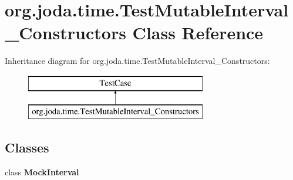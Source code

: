 \hypertarget{classorg_1_1joda_1_1time_1_1_test_mutable_interval___constructors}{\section{org.\-joda.\-time.\-Test\-Mutable\-Interval\-\_\-\-Constructors Class Reference}
\label{classorg_1_1joda_1_1time_1_1_test_mutable_interval___constructors}
}
Inheritance diagram for org.\-joda.\-time.\-Test\-Mutable\-Interval\-\_\-\-Constructors\-:\begin{figure}[H]
\begin{center}
\leavevmode
\includegraphics[height=2.000000cm]{classorg_1_1joda_1_1time_1_1_test_mutable_interval___constructors}
\end{center}
\end{figure}
\subsection*{Classes}
\begin{DoxyCompactItemize}
\item 
class {\bfseries Mock\-Interval}
\end{DoxyCompactItemize}
